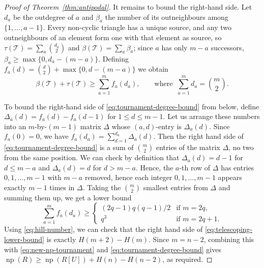 \documentclass{article}
\theoremstyle{plain}
\theoremstyle{definition}
\theoremstyle{remark}
\newcommand{\np}{\operatorname{np}}
\begin{document}
\begin{proof}[Proof of Theorem~\ref{thm:antipodal}]
It remains to bound the right-hand side.  Let \(d_a\) be the
outdegree of \(a\) and \(\beta_a\) the number of its outneighbours among
\(\{1,\ldots,a-1\}\).  Every non-cyclic triangle has a unique source, and
any two outneighbours of an element form one with that element as
source, so \(\tau(\mathcal T)=\sum_a\binom{d_a}2\) and
\(\beta(\mathcal T)=\sum_a \beta_a\); since \(a\) has only \(m-a\)
successors, \(\beta_a\geq\max\{0,d_a-(m-a)\}\).  Defining
\(f_a(d)=\binom d2+\max\{0,d-(m-a)\}\) we obtain
\begin{equation}\label{eq:tournament-degree-bound}
\beta(\mathcal T)+\tau(\mathcal T)\geq\sum_{a=1}^m f_a(d_a),
\qquad\text{where }\ \sum_{a=1}^m d_a=\binom m2 .
\end{equation}

To bound the right-hand side of
\eqref{eq:tournament-degree-bound} from below, define
\(\Delta_a(d)=f_a(d)-f_a(d-1)\) for \(1\leq d\leq m-1\).
Let us arrange these numbers into an \(m\)-by-\((m-1)\) matrix \(\Delta\) whose \((a,d)\)-entry is \(\Delta_a(d)\).
Since \(f_a(0)=0\), we have \(f_a(d_a)=\sum_{d=1}^{d_a}\Delta_a(d)\). Then the right hand side of \eqref{eq:tournament-degree-bound} is a sum of \(\binom{m}{2}\) entries of the matrix \(\Delta\), no two from the same position. We can check by definition that \(\Delta_a(d) = d-1\) for \(d \leq m-a\) and \(\Delta_a(d) = d\) for \(d > m-a\). Hence, the \(a\)-th row of \(\Delta\) has entries \(0,1,\ldots,m-1\) with \(m-a\) removed, hence each integer \(0,1,\ldots,m-1\) appears exactly \(m-1\) times in \(\Delta\). Taking the \(\binom{m}{2}\) smallest entries from \(\Delta\) and summing them up, we get a lower bound \begin{equation}\label{eq:telescoping-lower-bound}
    \sum_{a=1}^m f_a(d_a) \geq \begin{cases}
       (2q-1)q(q-1)/2 & \text{if \(m=2q\),}\\
       q^3 & \text{if \(m=2q+1\).}
    \end{cases}
\end{equation} Using \eqref{eq:hill-number}, we can check that the right hand side of \eqref{eq:telescoping-lower-bound} is exactly \(H(m+2) - H(m)\). Since \(m = n-2\), combining this with \eqref{eq:new-np-tournament} and \eqref{eq:tournament-degree-bound} gives \(\np(R) \geq \np(R[U]) + H(n) - H(n-2)\), as required.
\end{proof}
\end{document}

